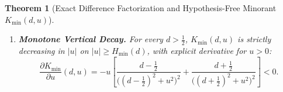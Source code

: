 \documentclass[11pt,reqno]{amsart}
\newtheorem{theorem}{Theorem}[section]
\theoremstyle{definition}
\theoremstyle{remark}
\numberwithin{equation}{section}
\begin{document}
\begin{theorem}[Exact Difference Factorization and Hypothesis-Free Minorant $K_{\min}(d,u)$]
\begin{enumerate}[label=\textup{(\roman*)},leftmargin=2.2em]
\begin{equation}\label{eq:H_min_def}
|u| \ge H_{\min}(d) := \sqrt{\frac{d^2 - 1/4}{3}},
\end{equation}
we have the hypothesis-free secant lower bound
\begin{equation}\label{eq:K_min_ineq}
K(d, d_\rho, u) \ge K_{\min}(d,u) > 0 \qquad \bigl(\forall\,d \ge \tfrac{1}{2},\; d_\rho \in (-1/2, 1/2),\; |u| \ge H_{\min}(d),\; u \neq 0\bigr).
\end{equation}
Inside the critical strip $0 < d < \frac{1}{2}$, the secant inequality $K(d, d_\rho, u) \ge K_{\min}(d,u) > 0$ holds for all $|u| > \sqrt{\frac{1}{4} - d^2}$ (where $W - \frac{1}{4} > 0$), whereas the pointwise derivative inequality $-\partial K/\partial(d_\rho^2) \ge 0$ in~\eqref{eq:dK_dv} holds at $d_\rho = 0$ for all $|u| \ge d/\sqrt{3}$.
\item \textbf{Monotone Vertical Decay.} For every $d > \frac{1}{2}$, $K_{\min}(d,u)$ is strictly decreasing in $|u|$ on $|u| \ge H_{\min}(d)$, with explicit derivative for $u > 0$:
\begin{equation}\label{eq:dK_min_du}
\frac{\partial K_{\min}}{\partial u}(d,u) = -u\left[\frac{d - \frac{1}{2}}{\bigl((d - \frac{1}{2})^2 + u^2\bigr)^2} + \frac{d + \frac{1}{2}}{\bigl((d + \frac{1}{2})^2 + u^2\bigr)^2}\right] < 0.
\end{equation}
\end{enumerate}
\end{theorem}
\end{document}
